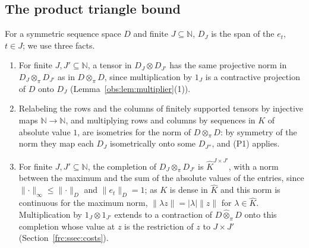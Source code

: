 \documentclass[11pt]{amsart}
\theoremstyle{definition}
\theoremstyle{remark}
\numberwithin{equation}{section}
\newcommand{\N}{\mathbb N}
\newcommand{\abs}[1]{\lvert #1\rvert}
\newcommand{\norm}[1]{\lVert #1\rVert}
\newcommand{\Kh}{\widehat K}
\theoremstyle{plain}
\theoremstyle{definition}
\theoremstyle{plain}
\begin{document}
\subsection{The product triangle bound}\label{frc:ssec:ptb}
For a symmetric sequence space $D$ and finite $J\subseteq\N$, $D_J$ is the span of the $e_t$, $t\in J$; we use three facts.
\begin{enumerate}
\item[(P1)] For finite $J,J'\subseteq\N$, a tensor in $D_J\otimes D_{J'}$ has the same projective norm in
$D_J\otimes_\pi D_{J'}$ as in $D\otimes_\pi D$, since multiplication by $1_J$ is a contractive projection of $D$ onto $D_J$
(Lemma~\ref{obs:lem:multiplier}(1)).
\item[(P2)] Relabeling the rows and the columns of finitely supported tensors by injective maps $\N\to\N$, and
multiplying rows and columns by sequences in $K$ of absolute value $1$, are isometries for the norm of $D\otimes_\pi D$:
by symmetry of the norm they map each $D_J$ isometrically onto some $D_{J''}$, and (P1) applies.
\item[(P3)] For finite $J,J'\subseteq\N$, the completion of $D_J\otimes_\pi D_{J'}$ is $\Kh^{J\times J'}$, with a norm
between the maximum and the sum of the absolute values of the entries, since $\norm\cdot_\infty\le\norm\cdot_D$ and
$\norm{e_t}_D=1$; as $K$ is dense in $\Kh$ and this norm is continuous for the maximum norm, $\norm{\lambda z}=\abs\lambda\norm z$
for $\lambda\in\Kh$. Multiplication by $1_J\otimes1_{J'}$ extends to a contraction of $D\widehat\otimes_\pi D$ onto this
completion whose value at $z$ is the restriction of $z$ to $J\times J'$ (Section~\ref{frc:ssec:costs}).
\end{enumerate}
\end{document}
